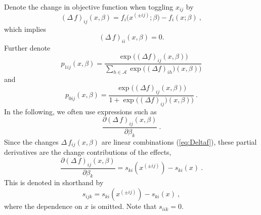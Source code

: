 \documentclass[a4paper,12pt,fleqn]{article}
\begin{document}
Denote the change in objective function when toggling $x_{ij} $ by
\[
(\Delta \, f)_{ij}(x, \beta) = f_i\big(x^{(\pm ij)}; \beta\big) - f_i(x; \beta) \ ,
\]
which implies
\[
(\Delta \, f)_{ii}(x, \beta) = 0 .
\]
Further denote
\begin{equation}        p_{1ij}(x, \beta) =
                  \frac{\exp\big((\Delta f)_{ij}(x, \beta)\big)}
         {\sum_{h \in \mathcal A} \exp\big((\Delta f)_{ih})(x, \beta)\big)}  \label{eq:p1}
\end{equation}
and
\begin{equation}        p_{0ij}(x, \beta) =
                  \frac{\exp\big((\Delta f)_{ij}(x, \beta)\big)}
         {1 +  \exp\big((\Delta f)_{ij})(x , \beta)\big)}  \label{eq:p0}
          \ .
\end{equation}
In the following, we often use expressions such as
\[
\frac{\partial (\Delta\, f)_{ij}(x, \beta)}{\partial \beta_k} \ .
\]
Since the changes $\Delta\, f_{ij}(x, \beta)$ are linear combinations
(\ref{eq:Deltaf}), these partial derivatives are
the change contributions of the effects,
\begin{equation}
\frac{\partial (\Delta\, f)_{ij}(x, \beta)}{\partial \beta_k}  = s_{ki}(x^{(\pm ij)}) - s_{ki}(x) \ .
\end{equation}
This is denoted in shorthand by
\begin{equation}
s_{ijk}  = s_{ki}(x^{(\pm ij)}) - s_{ki}(x) \ ,  \label{eq:s}
\end{equation}
where the dependence on $x$ is omitted. Note that $s_{iik} = 0$.
\end{document}
